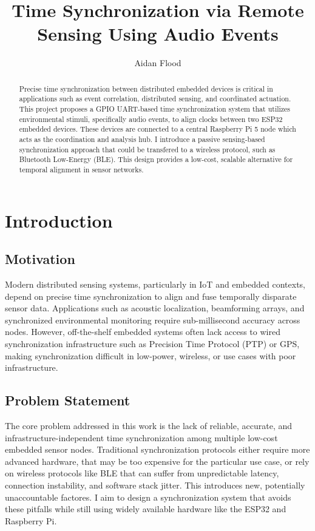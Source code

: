 \documentclass[sigconf]{acmart}
\title{Time Synchronization via Remote Sensing Using Audio Events}
\author{Aidan Flood}
\affiliation{\institution{University of Massachusetts Amherst}}
\begin{document}
\begin{abstract}
Precise time synchronization between distributed embedded devices is critical in applications such as event correlation, distributed sensing, and coordinated actuation. This project proposes a GPIO UART-based time synchronization system that utilizes environmental stimuli, specifically audio events, to align clocks between two ESP32 embedded devices. These devices are connected to a central Raspberry Pi 5 node which acts as the coordination and analysis hub. I introduce a passive sensing-based synchronization approach that could be transfered to a wireless protocol, such as Bluetooth Low-Energy (BLE). This design provides a low-cost, scalable alternative for temporal alignment in sensor networks.
\end{abstract}

\maketitle

\section{Introduction}
\subsection{Motivation}
Modern distributed sensing systems, particularly in IoT and embedded contexts, depend on precise time synchronization to align and fuse temporally disparate sensor data. Applications such as acoustic localization, beamforming arrays, and synchronized environmental monitoring require sub-millisecond accuracy across nodes. However, off-the-shelf embedded systems often lack access to wired synchronization infrastructure such as Precision Time Protocol (PTP) or GPS, making synchronization difficult in low-power, wireless, or use cases with poor infrastructure.

\subsection{Problem Statement}
The core problem addressed in this work is the lack of reliable, accurate, and infrastructure-independent time synchronization among multiple low-cost embedded sensor nodes. Traditional synchronization protocols either require more advanced hardware, that may be too expensive for the particular use case, or rely on wireless protocols like BLE that can suffer from unpredictable latency, connection instability, and software stack jitter. This introduces new, potentially unaccountable factores. I aim to design a synchronization system that avoids these pitfalls while still using widely available hardware like the ESP32 and Raspberry Pi.
\end{document}
